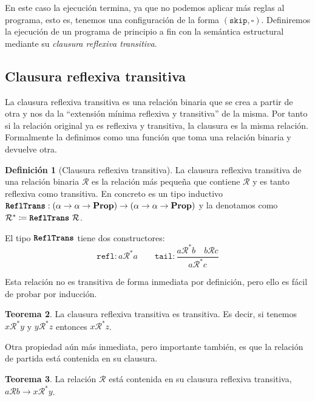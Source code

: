 \documentclass[
  a4paper, 
  10pt, 
  parskip=half, 
  toc=bibliography,
]{scrbook}
\theoremstyle{definition}
\theoremstyle{bolddef}
\newtheorem{theorem}{Teorema}[section]
\newtheorem{definition}[theorem]{Definición}
\newcommand{\funfont}[1]{\texttt{#1}}
\newcommand{\tyfont}[1]{\texttt{\textbf{#1}}}
\renewcommand{\implies}{\rightarrow}
\newcommand{\Prop}{\mathbf{Prop}}
\newcommand{\placeholder}{\square}
\newcommand{\ImpSkip}{\texttt{skip}}
\begin{document}
En este caso la ejecución termina, ya que no podemos aplicar más reglas al
programa, esto es, tenemos una configuración de la forma \((\ImpSkip, \placeholder)\).
Definiremos la ejecución de un programa de principio a fin con la semántica 
estructural mediante su \emph{clausura reflexiva transitiva}.

\subsection{Clausura reflexiva transitiva}

La clausura reflexiva transitiva es una relación binaria que se crea a partir de
otra y nos da la \enquote{extensión mínima reflexiva y transitiva} de la misma.
Por tanto si la relación original ya es reflexiva y transitiva, la
clausura es la misma relación. Formalmente la definimos como una función que
toma una relación binaria y devuelve otra.

\begin{definition}[Clausura reflexiva transitiva]
  La clausura reflexiva transitiva de una relación binaria \(\mathcal{R}\) es la
  relación más pequeña que contiene \(\mathcal{R}\) y es tanto reflexiva como
  transitiva. En concreto es un tipo inductivo 
  \(\tyfont{ReflTrans}: (\alpha \to \alpha \to \Prop) \to
  (\alpha \to \alpha \to \Prop)\) y la denotamos como
  \(\mathcal{R}^* \coloneqq \tyfont{ReflTrans} \ \mathcal{R}\).

  El tipo \(\tyfont{ReflTrans}\) tiene dos constructores:
  \[
    \funfont{refl}: a \mathcal{R}^* a
    \qquad 
    \funfont{tail}: \frac{
      a \mathcal{R}^* b
      \quad b \mathcal{R} c
    }{a \mathcal{R}^* c}
  \]
\end{definition}

Esta relación no es transitiva de forma inmediata por definición, pero ello es fácil de probar por
inducción.

\begin{theorem}
  La clausura reflexiva transitiva es transitiva. Es decir, si tenemos
  \(x \mathcal{R}^* y\) y \(y \mathcal{R}^* z\) entonces
  \(x \mathcal{R}^* z\).
\end{theorem}

Otra propiedad aún más inmediata, pero importante también, es que la relación de partida
está contenida en su clausura.

\begin{theorem}
  La relación \(\mathcal{R}\) está contenida en su clausura reflexiva transitiva,
  \(a \mathcal{R} b \implies x \mathcal{R}^* y\).
\end{theorem}
\end{document}
